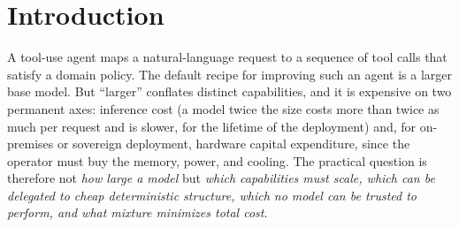\section{Introduction}\label{sec:intro}
A tool-use agent maps a natural-language request to a sequence of tool calls that satisfy a domain policy. The default recipe for improving such an agent is a larger base model. But ``larger'' conflates distinct capabilities, and it is expensive on two permanent axes: inference cost (a model twice the size costs more than twice as much per request and is slower, for the lifetime of the deployment) and, for on-premises or sovereign deployment, hardware capital expenditure, since the operator must buy the memory, power, and cooling. The practical question is therefore not \emph{how large a model} but \emph{which capabilities must scale, which can be delegated to cheap deterministic structure, which no model can be trusted to perform, and what mixture minimizes total cost}.

